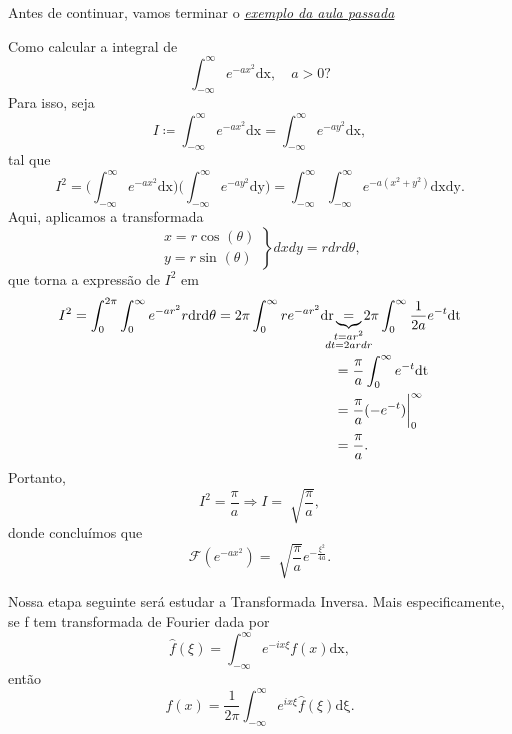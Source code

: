 \documentclass[../pde_notes.tex]{subfiles}
\begin{document}
Antes de continuar, vamos terminar o \hyperlink{last_class_21}{\textit{exemplo da aula passada}}
\begin{example}
	Como calcular a integral de
	\[
		\int_{-\infty}^{\infty}e^{-ax^{2}} \mathrm{dx},\quad a>0?
	\]
	Para isso, seja
	\[
		I \coloneqq \int_{-\infty}^{\infty}e^{-ax^{2}} \mathrm{dx} = \int_{-\infty}^{\infty}e^{-ay^{2}} \mathrm{dx},
	\]
	tal que
	\[
		I^{2} = \biggl(\int_{-\infty}^{\infty}e^{-ax^{2}} \mathrm{dx}\biggr)\biggl(\int_{-\infty}^{\infty}e^{-ay^{2}} \mathrm{dy}\biggr) = \int_{-\infty}^{\infty}\int_{-\infty}^{\infty}e^{-a(x^{2}+y^{2})} \mathrm{dx} \mathrm{dy}.
	\]
	Aqui, aplicamos a transformada
	\[
		\left.\begin{array}{ll}
			x = r\cos^{}{(\theta )} \\
			y = r\sin^{}{(\theta )}
		\end{array}\right\}dxdy = r drd\theta ,
	\]
	que torna a expressão de \(I^{2}\) em
	\begin{align*}
		I^{2} = \int_{0}^{2\pi }\int_{0}^{\infty}e^{-ar^{2}}r \mathrm{dr} \mathrm{d\theta } = 2\pi \int_{0}^{\infty}re^{-ar^{2}} \mathrm{dr} & \underbrace{=}_{\mathclap{\substack{t=ar^{2}         \\ dt = 2ardr}}} 2\pi \int_{0}^{\infty}\frac{1}{2a}e^{-t} \mathrm{dt}\\
		                                                                                                                                     & = \frac{\pi }{a}\int_{0}^{\infty}e^{-t} \mathrm{dt}  \\
		                                                                                                                                     & = \frac{\pi }{a}(-e^{-t})\biggl|_{0}^{\infty}\biggr. \\
		                                                                                                                                     & = \frac{\pi }{a}.
	\end{align*}
	Portanto,
	\[
		I^{2} = \frac{\pi }{a} \Rightarrow I = \sqrt[]{\frac{\pi }{a}},
	\]
	donde concluímos que
	\[
		\mathcal{F}(e^{-ax^{2}}) = \sqrt[]{\frac{\pi }{a}}e^{-\frac{\xi^{2}}{4a}}.
	\]
\end{example}

Nossa etapa seguinte será estudar a Transformada Inversa. Mais especificamente, se f tem transformada de Fourier dada por
\[
	\hat{f}(\xi ) = \int_{-\infty}^{\infty}e^{-ix\xi }f(x) \mathrm{dx},
\]
então
\[
	f(x) = \frac{1}{2\pi }\int_{-\infty}^{\infty}e^{ix\xi }\hat{f}(\xi ) \mathrm{d\xi }.
\]
\end{document}
